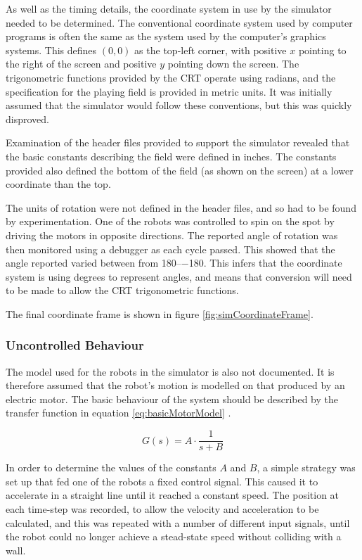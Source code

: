 \documentclass[10pt]{article}
\begin{document}
As well as the timing details, the coordinate system in use by the simulator
needed to be determined.  The conventional coordinate system used by computer
programs is often the same as the system used by the computer's graphics
systems. This defines $\left(0,0\right)$ as the top-left corner, with positive
$x$ pointing to the right of the screen and positive $y$ pointing down the
screen. The trigonometric functions provided by the \ac{CRT} operate using
radians, and the specification for the playing field is provided in metric
units.  It was initially assumed that the simulator would follow these
conventions, but this was quickly disproved.

Examination of the header files provided to support the simulator revealed that
the basic constants describing the field were defined in inches. The constants
provided also defined the bottom of the field (as shown on the screen) at a
lower coordinate than the top.

The units of rotation were not defined in the header files, and so had to be
found by experimentation.  One of the robots was controlled to spin on the spot
by driving the motors in opposite directions.  The reported angle of rotation
was then monitored using a debugger as each cycle passed.  This showed that the
angle reported varied between from \numrange{+180}{-180}.  This infers that the
coordinate system is using degrees to represent angles, and means that
conversion will need to be made to allow the \ac{CRT} trigonometric functions.

The final coordinate frame is shown in figure \ref{fig:simCoordinateFrame}.

\subsubsection{Uncontrolled Behaviour}

The model used for the robots in the simulator is also not documented. It is
therefore assumed that the robot's motion is modelled on that produced by an
electric motor. The basic behaviour of the system should be described by the
transfer function in equation \ref{eq:basicMotorModel} \cite{basicControlNotes}.

\begin{equation}
 \label{eq:basicMotorModel}
 G\left(s\right) = A \cdot \frac{1}{s+B}
\end{equation}

In order to determine the values of the constants $A$ and $B$, a simple strategy
was set up that fed one of the robots a fixed control signal.  This caused it to
accelerate in a straight line until it reached a constant speed.  The position
at each time-step was recorded, to allow the velocity and acceleration to be
calculated, and this was repeated with a number of different input signals,
until the robot could no longer achieve a stead-state speed without colliding
with a wall.
\end{document}
